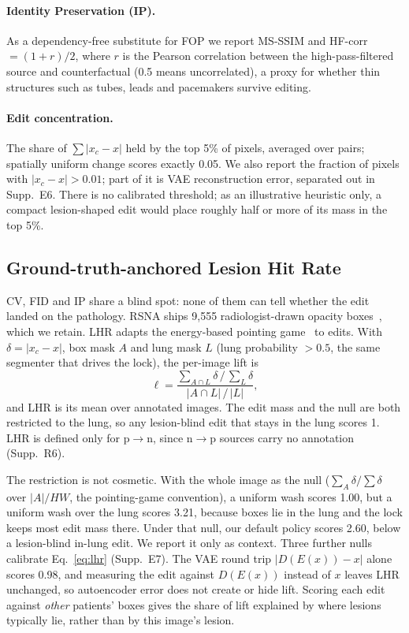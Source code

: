 \paragraph{Identity Preservation (IP).} As a dependency-free substitute for FOP we report MS-SSIM and HF-corr $= (1 + r)/2$, where $r$ is the Pearson correlation between the high-pass-filtered source and counterfactual (0.5 means uncorrelated), a proxy for whether thin structures such as tubes, leads and pacemakers survive editing.

\paragraph{Edit concentration.} The share of $\sum |x_c - x|$ held by the top 5\% of pixels, averaged over pairs; spatially uniform change scores exactly 0.05. We also report the fraction of pixels with $|x_c - x| > 0.01$; part of it is VAE reconstruction error, separated out in Supp.~E6. There is no calibrated threshold; as an illustrative heuristic only, a compact lesion-shaped edit would place roughly half or more of its mass in the top 5\%.

\subsection{Ground-truth-anchored Lesion Hit Rate}
\label{sec:lhr}

CV, FID and IP share a blind spot: none of them can tell whether the edit landed on the pathology. RSNA ships 9{,}555 radiologist-drawn opacity boxes~\cite{shih2019augmenting}, which we retain. LHR adapts the energy-based pointing game~\cite{wang2020scorecam} to edits. With $\delta = |x_c - x|$, box mask $A$ and lung mask $L$ (lung probability $>0.5$, the same segmenter that drives the lock), the per-image lift is
\begin{equation}
\ell = \frac{\sum_{A \cap L} \delta \,/\, \sum_{L} \delta}{|A \cap L| \,/\, |L|},
\label{eq:lhr}
\end{equation}
and LHR is its mean over annotated images. The edit mass and the null are both restricted to the lung, so any lesion-blind edit that stays in the lung scores 1. LHR is defined only for p$\to$n, since n$\to$p sources carry no annotation (Supp.~R6).

The restriction is not cosmetic. With the whole image as the null ($\sum_A \delta / \sum \delta$ over $|A|/HW$, the pointing-game convention), a uniform wash scores 1.00, but a uniform wash over the lung scores 3.21, because boxes lie in the lung and the lock keeps most edit mass there. Under that null, our default policy scores 2.60, below a lesion-blind in-lung edit. We report it only as context. Three further nulls calibrate Eq.~\eqref{eq:lhr} (Supp.~E7). The VAE round trip $|D(E(x)) - x|$ alone scores 0.98, and measuring the edit against $D(E(x))$ instead of $x$ leaves LHR unchanged, so autoencoder error does not create or hide lift. Scoring each edit against \emph{other} patients' boxes gives the share of lift explained by where lesions typically lie, rather than by this image's lesion.

